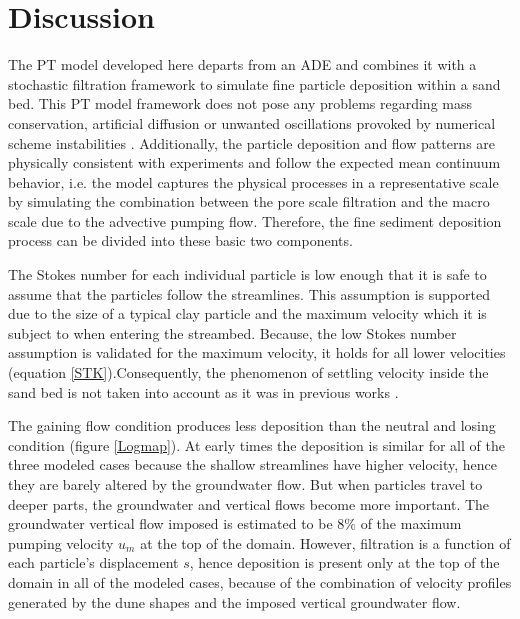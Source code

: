 \documentclass[draft,linenumbers]{agujournal2018}
\begin{document}
\section{Discussion} \label{Discussion}

The PT model developed here departs from an ADE and combines it with a stochastic filtration framework \citep{Li2017} to simulate fine particle deposition within a sand bed. This PT model framework does not pose any problems regarding mass conservation, artificial diffusion or unwanted oscillations provoked by numerical scheme instabilities \citep{Delay2005}. Additionally, the particle deposition and flow patterns are physically consistent with experiments and follow the expected mean continuum behavior, i.e. the model captures the physical processes in a representative scale by simulating the combination between the pore scale filtration and the macro scale due to the advective pumping flow. Therefore, the fine sediment deposition process can be divided into these basic two components.

The Stokes number for each individual particle is low enough that it is safe to assume that the particles follow the streamlines. This assumption is supported due to the size of a typical clay particle and the maximum velocity which it is subject to when entering the streambed. Because, the low Stokes number assumption is validated for the maximum velocity, it holds for all lower velocities (equation \ref{STK}).Consequently, the phenomenon of settling velocity inside the sand bed is not taken into account as it was in previous works \citep{Packman2000}.

The gaining flow condition produces less deposition than the neutral and losing condition (figure \ref{Logmap}). At early times the deposition is similar for all of the three modeled cases because the shallow streamlines have higher velocity, hence they are barely altered by the groundwater flow. But when particles travel to deeper parts, the groundwater and vertical flows become more important. The groundwater vertical flow imposed is estimated to be $8 \%$ of the maximum pumping velocity $u_m$ at the top of the domain. However, filtration is a function of each particle's displacement $s$, hence deposition is present only at the top of the domain in all of the modeled cases, because of the combination of velocity profiles generated by the dune shapes and the imposed vertical groundwater flow.
\end{document}
